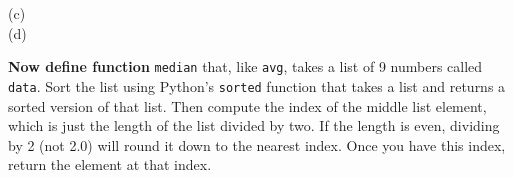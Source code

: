 \documentclass[titlepage]{tufte-book}
\begin{document}
\begin{marginfigure}
\begin{center}
(c) \\
(d) 
\end{center}
\label{obama}
\end{marginfigure}


{\bf Now define function} {\tt median} that, like {\tt avg}, takes a list of 9 numbers called {\tt data}. Sort the list using Python's {\tt sorted} function that takes a list and returns a sorted version of that list. Then compute the index of the middle list element, which is just the length of the list divided by two. If the length is even, dividing by 2 (not 2.0) will round it down to the nearest index. Once you have this index, return the element at that index.
\end{document}
